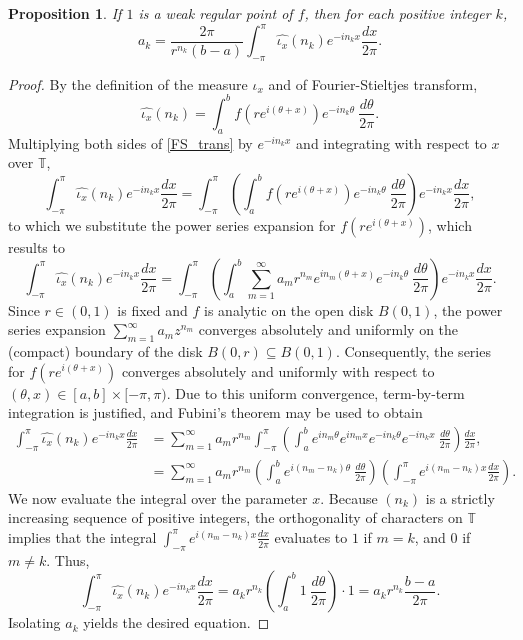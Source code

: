 \documentclass[10pt,a4paper]{amsart}
\newcommand{\T}{\mathbb{T}}
\def\sub{\subseteq}
\def\sub{\subseteq}
\newtheorem{proposition}[theorem]{Proposition}
\begin{document}
\begin{proposition}\label{coeffProp}
If $1$ is a weak regular point of $f$, then for each positive integer $k$, 
\[
a_k = \frac{2\pi}{r^{n_k}(b-a)} \int_{-\pi}^\pi \widehat{\iota_x}(n_k) e^{-in_k x} \frac{dx}{2\pi}.
\]
\end{proposition}

\begin{proof}
By the definition of the measure $\iota_x$ and of Fourier-Stieltjes transform,
\begin{equation}
\widehat{\iota_x}(n_k) = \int_{a}^{b} f(re^{i(\theta+x)})e^{-in_k\theta}\ \frac{d\theta}{2\pi}.\label{FS_trans}
\end{equation}
Multiplying both sides of \eqref{FS_trans} by $e^{-in_k x}$ and integrating with respect to $x$ over $\T$,
\[
\int_{-\pi}^\pi \widehat{\iota_x}(n_k) e^{-in_k x} \frac{dx}{2\pi} = \int_{-\pi}^\pi \left( \int_{a}^{b} f(re^{i(\theta+x)}) e^{-in_k\theta} \ \frac{d\theta}{2\pi} \right) e^{-in_k x} \frac{dx}{2\pi},
\]
 to which we substitute the power series expansion for $f(re^{i(\theta+x)})$, which results to
\[
\int_{-\pi}^\pi \widehat{\iota_x}(n_k) e^{-in_k x} \frac{dx}{2\pi} = \int_{-\pi}^\pi \left( \int_{a}^{b} \sum_{m=1}^\infty a_m r^{n_m} e^{in_m(\theta+x)} e^{-in_k\theta} \ \frac{d\theta}{2\pi} \right) e^{-in_k x} \frac{dx}{2\pi}.
\]
Since $r \in (0,1)$ is fixed and $f$ is analytic on the open disk $B(0,1)$, the power series expansion $\sum_{m=1}^\infty a_m z^{n_m}$ converges absolutely and uniformly on the (compact) boundary of the disk $B(0,r)\sub B(0,1)$. Consequently, the series for $f(re^{i(\theta+x)})$ converges absolutely and uniformly with respect to $(\theta, x) \in [a,b] \times [-\pi, \pi)$. Due to this uniform convergence, term-by-term integration is justified, and Fubini's theorem may be used to obtain
\begin{align*}
\int_{-\pi}^\pi \widehat{\iota_x}(n_k) e^{-in_k x} \frac{dx}{2\pi} &= \sum_{m=1}^\infty a_m r^{n_m} \int_{-\pi}^\pi \left( \int_{a}^{b} e^{in_m\theta} e^{in_mx} e^{-in_k\theta} e^{-in_k x} \ \frac{d\theta}{2\pi} \right) \frac{dx}{2\pi}, \\
&= \sum_{m=1}^\infty a_m r^{n_m} \left( \int_{a}^{b} e^{i(n_m - n_k)\theta}\ \frac{d\theta}{2\pi} \right) \left( \int_{-\pi}^\pi e^{i(n_m - n_k)x} \frac{dx}{2\pi} \right).
\end{align*}
We now evaluate the integral over the parameter $x$. Because $(n_k)$ is a strictly increasing sequence of positive integers, the orthogonality of characters on $\T$ implies that the integral $\int_{-\pi}^\pi e^{i(n_m - n_k)x} \frac{dx}{2\pi}$ evaluates to $1$ if $m = k$, and $0$ if $m \neq k$. Thus, 
\[
\int_{-\pi}^\pi \widehat{\iota_x}(n_k) e^{-in_k x} \frac{dx}{2\pi} = a_k r^{n_k} \left( \int_{a}^{b} 1\ \frac{d\theta}{2\pi} \right) \cdot 1 = a_k r^{n_k} \frac{b-a}{2\pi}.
\]
Isolating $a_k$ yields the desired equation.
\end{proof}
\end{document}
